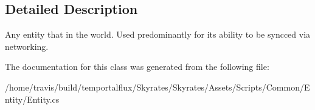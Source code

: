 \subsection{Detailed Description}
Any entity that in the world. Used predominantly for its ability to be syncced via networking. 



The documentation for this class was generated from the following file\-:\begin{DoxyCompactItemize}
\item 
/home/travis/build/temportalflux/\-Skyrates/\-Skyrates/\-Assets/\-Scripts/\-Common/\-Entity/Entity.\-cs\end{DoxyCompactItemize}
